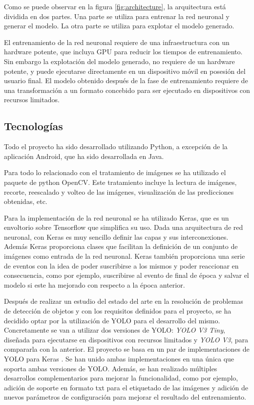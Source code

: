 Como se puede observar en la figura \ref{fig:architecture}, la arquitectura está dividida en dos partes. Una parte se utiliza para entrenar la red neuronal y generar el modelo. La otra parte se utiliza para explotar el modelo generado.

El entrenamiento de la red neuronal requiere de una infraestructura con un hardware potente, que incluya GPU para reducir los tiempos de entrenamiento. Sin embargo la explotación del modelo generado, no  requiere de un hardware potente, y puede ejecutarse directamente en un dispositivo móvil en posesión del usuario final. El modelo obtenido después de la fase de entrenamiento requiere de una transformación a un formato concebido para ser ejecutado en dispositivos con recursos limitados.

\subsection{Tecnologías}

Todo el proyecto ha sido desarrollado utilizando Python, a excepción de la aplicación Android, que ha sido desarrollada en Java.

Para todo lo relacionado con el tratamiento de imágenes se ha utilizado el paquete de python OpenCV. Este tratamiento incluye la lectura de imágenes, recorte, reescalado y volteo de las imágenes, visualización de las predicciones obtenidas, etc.

Para la implementación de la red neuronal se ha utilizado Keras, que es un envoltorio sobre Tensorflow que simplifica su uso. Dada una arquitectura de red neuronal, con Keras es muy sencillo definir las capas y sus interconexiones. Además Keras proporciona clases que facilitan la definición de un conjunto de imágenes como entrada de la red neuronal. Keras también proporciona una serie de eventos con la idea de poder suscribirse a los mismos y poder reaccionar en consecuencia, como por ejemplo, suscribirse al evento de final de época y salvar el modelo si este ha mejorado con respecto a la época anterior.

Después de realizar un estudio del estado del arte en la resolución de problemas de detección de objetos y con los requisitos definidos para el proyecto, se ha decidido optar por la utilización de YOLO para el desarrollo del mismo. Concretamente se van a utilizar dos versiones de YOLO: \textit{YOLO V3 Tiny}, diseñada para ejecutarse en dispositivos con recursos limitados y \textit{YOLO V3}, para compararla con la anterior. El proyecto se basa en un par de implementaciones de YOLO para Keras \cite{s3_yolov3_orig} \cite{s3_yolov3tiny_orig}. Se han unido ambas implementaciones en una única \cite{s3_yolo_dicastro} que soporta ambas versiones de YOLO. Además, se han realizado múltiples desarrollos complementarios para mejorar la funcionalidad, como por ejemplo, adición de soporte en formato txt para el etiquetado de las imágenes y adición de nuevos parámetros de configuración para mejorar el resultado del entrenamiento.

